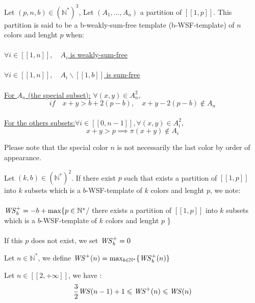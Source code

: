 \begin{definition}
Let \( (p,n,b) \in (\mathbb{N}^*)^3\), Let \((A_1,...,A_n)\) a partition of  \([\![1, p]\!]\).
This partition is said to be a b-weakly-sum-free template (b-WSF-template) of \(n\) colors and lenght \(p\) when:
\\\\
\underline{\(\forall i \in [\![1, n]\!], \quad A_i\) is weakly-sum-free}
\\\\
\underline{\(\forall i \in [\![1, n]\!], \quad A_i\backslash [\![1, b]\!]\) is sum-free}
\\\\
\underline{For \(A_n\) (the special subset):} \quad \(\forall (x,y) \in A_n^2,\)
\\
\[if \quad x+y>b+2(p-b),\quad x+y-2(p-b)\notin A_n\]
\\
\underline{For the others subsets:}\quad \(\forall i \in [\![0,n-1]\!], \forall(x,y) \in A_i^2,\)
\\
\[
x+y>p \implies \pi(x+y) \notin A_i
\]
\end{definition}


\begin{remark}
	Please note that the special color \(n\) is not necessarily the last color by order of appearance.
\end{remark}

\begin{definition}
Let \( (k,b) \in (\mathbb{N}^*)^2\). If there exist \(p\) such that exists a partition of \([\![1, p]\!]\) into \(k\)
subsets which is a \(b\)-WSF-template of \(k\) colors and lenght \(p\), we note:
\\\\\(\mathit{WS}_b^+=-b+\max \{p\in \mathbb{N}^*\)/ there exists a partition of \([\![1, p]\!]\) into \(k\) subsets which is a
\(b\)-WSF-template of \(k\) colors and lenght \(p\) \}
\\\\
If this \(p\) does not exist, we set \(\mathit{WS}_b^+= 0\)
\end{definition}

\begin{definition}
Let \( n \in \mathbb{N}^*\), we define \(\mathit{WS}^+(n)=\max_{b\in \mathbb{N}^*} \{\mathit{WS}_b^+(n)\}\)
\end{definition}

\begin{proposition}
	Let \(n \in [\![2, +\infty]\!]\), we have :
	\[
	\frac{3}{2} \mathit{WS} (n-1)+1 \leqslant \mathit{WS}^+(n) \leqslant \mathit{WS} (n)
	\]
\end{proposition}

